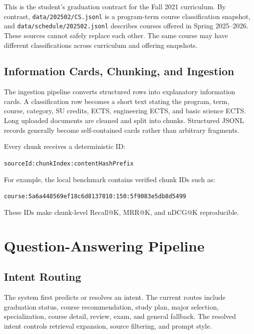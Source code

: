 \documentclass[10pt,a4paper]{article}
\newcommand{\code}[1]{\texttt{\small #1}}
\begin{document}
This is the student's graduation contract for the Fall 2021 curriculum. By contrast, \code{data/202502/CS.jsonl} is a program-term course classification snapshot, and \code{data/schedule/202502.jsonl} describes courses offered in Spring 2025--2026. These sources cannot safely replace each other. The same course may have different classifications across curriculum and offering snapshots.

\subsection{Information Cards, Chunking, and Ingestion}



The ingestion pipeline converts structured rows into explanatory information cards. A classification row becomes a short text stating the program, term, course, category, SU credits, ECTS, engineering ECTS, and basic science ECTS. Long uploaded documents are cleaned and split into chunks. Structured JSONL records generally become self-contained cards rather than arbitrary fragments.

Every chunk receives a deterministic ID:

\begin{center}
\code{sourceId:chunkIndex:contentHashPrefix}
\end{center}

For example, the local benchmark contains verified chunk IDs such as:

\begin{center}
{\scriptsize\code{course:5a6a448569ef18c6d8137810:150:5f9083e5db8d5499}}
\end{center}

These IDs make chunk-level Recall@K, MRR@K, and nDCG@K reproducible.

\section{Question-Answering Pipeline}

\subsection{Intent Routing}

The system first predicts or resolves an intent. The current routes include graduation status, course recommendation, study plan, major selection, specialization, course detail, review, exam, and general fallback. The resolved intent controls retrieval expansion, source filtering, and prompt style.
\end{document}
